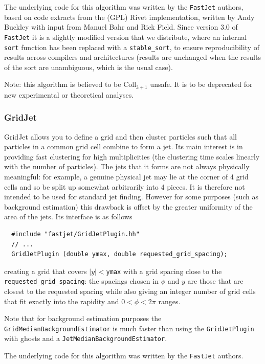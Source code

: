 \documentclass[12pt,a4]{article}
\newcommand{\fastjet}{\texttt{FastJet}\xspace}
\newcommand{\ttt}[1]{{\small\texttt{#1}}}
\begin{document}
The underlying code for this algorithm was written by the \fastjet
authors, based on code extracts from the (GPL) Rivet implementation, written
by Andy Buckley with input from Manuel Bahr and Rick Field.
%
Since version 3.0 of \fastjet it is a slightly modified version that
we distribute, where an internal \ttt{sort} function has been replaced
with a \ttt{stable\_sort}, to ensure reproducibility of results across
compilers and architectures (results are unchanged when the results of
the sort are unambiguous, which is the usual case).

Note: this algorithm is believed to be Coll$_{3+1}$ unsafe. It is to
be deprecated for new experimental or theoretical analyses.

\subsubsection{GridJet}
%
GridJet allows you to define a grid and then cluster particles such
that all particles in a common grid cell combine to form a jet.
%
Its main interest is in providing fast clustering for high
multiplicities (the clustering time scales linearly with the number of
particles).
%
The jets that it forms are not always physically meaningful: for
example, a genuine physical jet may lie at the corner of 4 grid cells
and so be split up somewhat arbitrarily into 4 pieces.
%
It is therefore not intended to be used for standard jet finding.
%
However for some purposes (such as background estimation) this
drawback is offset by the greater uniformity of the area of the jets.
%
Its interface is as follows
\begin{lstlisting}
  #include "fastjet/GridJetPlugin.hh"
  // ...
  GridJetPlugin (double ymax, double requested_grid_spacing);
\end{lstlisting}
creating a grid that covers $|y|<$\ttt{ymax} with a grid spacing close
to the \ttt{requested\_grid\_spacing}: the spacings chosen in $\phi$
and $y$ are those that are closest to the requested spacing while also
giving an integer number of grid cells that fit exactly into the
rapidity and $0<\phi <2\pi$ ranges.

Note that for background estimation purposes the
\ttt{GridMedianBackgroundEstimator} is much faster than using the
\ttt{GridJetPlugin} with ghosts and a
\ttt{JetMedianBackgroundEstimator}.

The underlying code for this algorithm was written by the \fastjet
authors.


\end{document}
